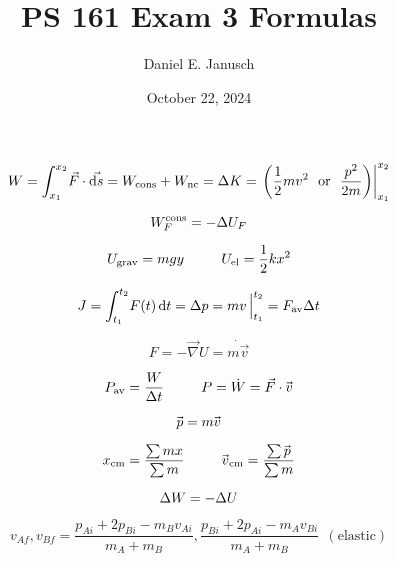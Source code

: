 \documentclass[12pt]{article}
\begin{document}

\title{PS 161 Exam 3 Formulas}
\author{Daniel E. Janusch}
\date{October 22, 2024}
\maketitle
\fi

\begin{equation}
	W = \int_{x_1}^{x_2} \! \vec F \cdot \vec {\textrm ds} = W_{\textrm{cons}} + W_{\textrm{nc}} = \Delta K = \left. \left(\dfrac 12 mv^2~~\text{or}~~\dfrac{p^2}{2m}\right) \right|_{x_1}^{x_2}
\end{equation}

\begin{equation}
	W_F^{\textrm{cons}} = -\Delta U_F
\end{equation}

\begin{equation}
	U_{\textrm{grav}} = mgy ~~~~~~~~ U_{\textrm{el}} = \dfrac 12 k x^2
\end{equation}

\begin{equation}
	J = \int_{t_1}^{t_2} \! F(t) \,\text dt = \Delta p = mv \, \Big|_{t_1}^{t_2} = F_{\textrm{av}}\Delta t
\end{equation}

\begin{equation}
	F = -\vec \nabla U = \dot{m\vec v}
\end{equation}

\begin{equation}
	P_\av = \dfrac W \Dt ~~~~~~~~ P = \dot W = \vec F \cdot \vvec
\end{equation}

\begin{equation}
	\pvec = m\vvec
\end{equation}

\begin{equation}
	x_\cm = \dfrac{\sum mx}{\sum m} ~~~~~~~~ \vvec_\cm = \dfrac{\sum \pvec}{\sum m}
\end{equation}

\begin{equation}
	\Delta W = -\Delta U
\end{equation}

\begin{equation}
	v_{Af},v_{Bf} = \dfrac{p_{Ai} + 2 p_{Bi} - m_B v_{Ai}}{m_A + m_B}, \dfrac{p_{Bi} + 2 p_{Ai} - m_A v_{Bi}}{m_A + m_B}~~(\text{elastic})
\end{equation}


\ifx \combinedDocuments \undefined
\end{document}
